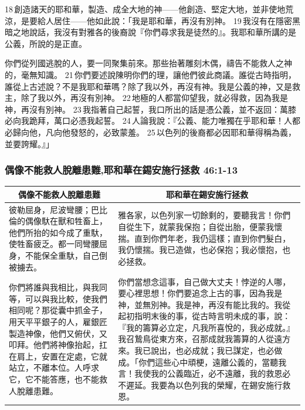 18 創造諸天的耶和華，製造、成全大地的神——他創造、堅定大地，並非使地荒涼，是要給人居住——他如此說：「我是耶和華，再沒有別神。 19 我沒有在隱密黑暗之地說話，我沒有對雅各的後裔說『你們尋求我是徒然的』。我耶和華所講的是公義，所說的是正直。

你們從列國逃脫的人，要一同聚集前來。那些抬著雕刻木偶，禱告不能救人之神的，毫無知識。 21 你們要述說陳明你們的理，讓他們彼此商議。誰從古時指明，誰從上古述說？不是我耶和華嗎？除了我以外，再沒有神。我是公義的神，又是救主，除了我以外，再沒有別神。 22 地極的人都當仰望我，就必得救，因為我是神，再沒有別神。 23 我指著自己起誓，我口所出的話是憑公義，並不返回：萬膝必向我跪拜，萬口必憑我起誓。 24 人論我說：『公義、能力唯獨在乎耶和華！人都必歸向他，凡向他發怒的，必致蒙羞。 25 以色列的後裔都必因耶和華得稱為義，並要誇耀。』」


\subsubsection{偶像不能救人脫離患難,耶和華在錫安施行拯救 46:1-13}
\begin{table}[H]
\centering
\begin{tabular}{p{6.75cm}|p{10.50cm}}\hline\hline
\multicolumn{1}{c|}{偶像不能救人脫離患難}&\multicolumn{1}{c}{耶和華在錫安施行拯救}\\\hline
彼勒屈身，尼波彎腰；巴比倫的偶像馱在獸和牲畜上，他們所抬的如今成了重馱，使牲畜疲乏。都一同彎腰屈身，不能保全重馱，自己倒被擄去。
&雅各家，以色列家一切餘剩的，要聽我言！你們自從生下，就蒙我保抱；自從出胎，便蒙我懷揣。直到你們年老，我仍這樣；直到你們髮白，我仍懷揣。我已造做，也必保抱；我必懷抱，也必拯救。\\\hline
你們將誰與我相比，與我同等，可以與我比較，使我們相同呢？那從囊中抓金子，用天平平銀子的人，雇銀匠製造神像，他們又俯伏，又叩拜。他們將神像抬起，扛在肩上，安置在定處，它就站立，不離本位。人呼求它，它不能答應，也不能救人脫離患難。
&你們當想念這事，自己做大丈夫！悖逆的人哪，要心裡思想！你們要追念上古的事，因為我是神，並無別神。我是神，再沒有能比我的。我從起初指明末後的事，從古時言明未成的事，說：『我的籌算必立定，凡我所喜悅的，我必成就。』我召鷙鳥從東方來，召那成就我籌算的人從遠方來。我已說出，也必成就；我已謀定，也必做成。「你們這些心中頑梗，遠離公義的，當聽我言！我使我的公義臨近，必不遠離，我的救恩必不遲延。我要為以色列我的榮耀，在錫安施行救恩。\\\hline
\end{tabular}
\end{table}


